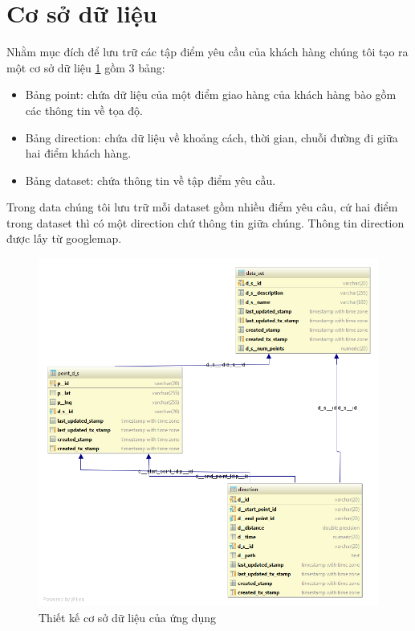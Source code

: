 \documentclass[a4paper,12pt]{report}
\begin{document}
\section{Cơ sở dữ liệu}
Nhằm mục đích để lưu trữ các tập điểm yêu cầu của khách hàng chúng tôi tạo ra một cơ sở dữ liệu \ref{database} gồm 3 bảng: 
\begin{itemize}
\item Bảng point: chứa dữ liệu của một điểm giao hàng của khách hàng bào gồm các thông tin về tọa độ.
\item Bảng direction: chứa dữ liệu về khoảng cách, thời gian, chuỗi đường đi giữa hai điểm khách hàng.
\item Bảng dataset: chứa thông tin về tập điểm yêu cầu.
\end{itemize}
Trong data chúng tôi lưu trữ mỗi dataset gồm nhiều điểm yêu câu, cứ hai điểm trong dataset thì có một direction chứ thông tin giữa chúng. Thông tin direction được lấy từ googlemap.
\begin{figure}

\includegraphics[scale=0.6]{database.png}
\caption{Thiết kế cơ sở dữ liệu của ứng dụng}
\label{database}
\end{figure}
\end{document}
